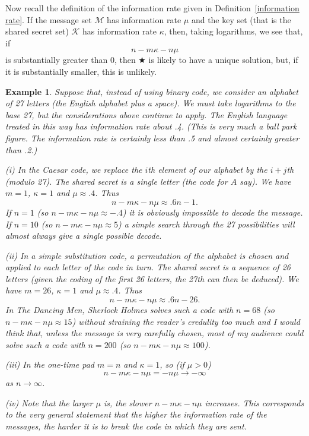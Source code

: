 \documentclass[12pt,a4paper]{article}
\theoremstyle{plain}
\newtheorem{example}[theorem]{Example}
\theoremstyle{definition}
\begin{document}
    Now recall the definition of the information rate
    given in Definition~\ref{information rate}.
    If the message set ${\mathcal M}$
    has information rate $\mu$
    and the key set (that is the
    shared secret set) $\mathcal{K}$
    has information rate $\kappa$, then, taking logarithms,
    we see that, if
    \[n-m\kappa-n\mu\]
    is substantially greater than $0$, then $\bigstar$
    is likely to have a unique solution, but, if it is
    substantially smaller, this is unlikely.
    \begin{example}
        Suppose that,
        instead of using binary
        code, we consider an alphabet of 27 letters
        (the English alphabet plus a space). We must
        take logarithms to the base 27, but the considerations
        above continue to apply. The English language
        treated in this way has information rate
        about .4. (This is very much a ball park figure.
        The information rate is certainly less than .5
        and almost certainly greater than .2.)

        (i) In the Caesar code, we replace the $i$th element
        of our alphabet by the $i+j$th (modulo 27). The
        shared secret is a single letter (the code for $A$ say).
        We have $m=1$, $\kappa=1$ and $\mu\approx .4$. Thus
        \[n-m\kappa-n\mu\approx .6n-1.\]
        If $n=1$ (so $n-m\kappa-n\mu\approx-.4$) it is obviously
        impossible to decode the message. If $n=10$
        (so $n-m\kappa-n\mu\approx 5$) a simple search through the
        27 possibilities will almost always give a single
        possible decode.

        (ii) In a simple substitution code, a permutation of the
        alphabet is chosen and applied to each letter of the
        code in turn. The shared secret is a sequence of
        26 letters (given the coding of the first 26 letters,
        the 27th can then be deduced).
        We have $m=26$, $\kappa=1$ and $\mu\approx .4$. Thus
        \[n-m\kappa-n\mu\approx .6n-26.\]
        In \emph{The Dancing Men}, Sherlock Holmes
        solves such a code with $n=68$
        (so $n-m\kappa-n\mu\approx 15$) without straining
        the reader's credulity too much and I
        would think that, unless the message is
        very carefully chosen, most of my audience
        could solve such a code with $n=200$
        (so $n-m\kappa-n\mu\approx 100$).

        (iii) In the one-time pad $m=n$ and $\kappa=1$,
        so (if $\mu>0$)
        \[n-m\kappa-n\mu=-n\mu\rightarrow-\infty\]
        as $n\rightarrow\infty$.

        (iv) Note that the larger $\mu$ is, the slower
        $n-m\kappa-n\mu$ increases. This corresponds
        to the very general statement that the
        higher the information rate of the messages,
        the harder it is to break the code in which they
        are sent.
    \end{example}
\end{document}
